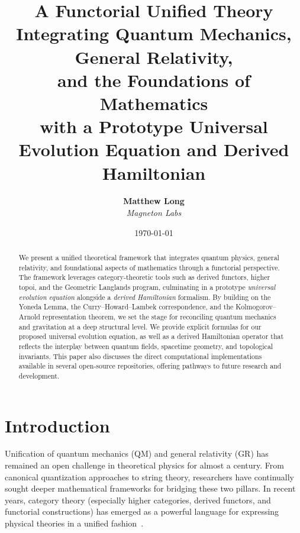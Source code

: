 \documentclass[11pt]{article}
\title{\textbf{A Functorial Unified Theory Integrating Quantum Mechanics, General Relativity,\\
and the Foundations of Mathematics\\
\large with a Prototype Universal Evolution Equation and Derived Hamiltonian}}
\author{
  \textbf{Matthew Long}\\
  \textit{Magneton Labs}
}
\date{\today}
\begin{document}
\maketitle

\begin{abstract}
We present a unified theoretical framework that integrates quantum physics, general relativity, and foundational aspects of mathematics through a functorial perspective. The framework leverages category-theoretic tools such as derived functors, higher topoi, and the Geometric Langlands program, culminating in a prototype \emph{universal evolution equation} alongside a \emph{derived Hamiltonian} formalism. By building on the Yoneda Lemma, the Curry--Howard--Lambek correspondence, and the Kolmogorov--Arnold representation theorem, we set the stage for reconciling quantum mechanics and gravitation at a deep structural level. We provide explicit formulas for our proposed universal evolution equation, as well as a derived Hamiltonian operator that reflects the interplay between quantum fields, spacetime geometry, and topological invariants. This paper also discusses the direct computational implementations available in several open-source repositories, offering pathways to future research and development. 
\end{abstract}

\tableofcontents

\section{Introduction}
\label{sec:intro}

Unification of quantum mechanics (QM) and general relativity (GR) has remained an open challenge in theoretical physics for almost a century. From canonical quantization approaches to string theory, researchers have continually sought deeper mathematical frameworks for bridging these two pillars. In recent years, category theory (especially higher categories, derived functors, and functorial constructions) has emerged as a powerful language for expressing physical theories in a unified fashion~\cite{MacLane, Grothendieck, BaezDolan}.
\end{document}
